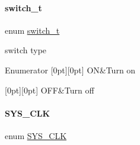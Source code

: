 \paragraph{\texorpdfstring{switch\+\_\+t}{switch\_t}}
{\footnotesize\ttfamily enum \mbox{\hyperlink{a00020_ab43e533f3793920486fb81c580f71564}{switch\+\_\+t}}}

switch type \begin{DoxyEnumFields}{Enumerator}
[0pt][0pt]{}\mbox{\label{a00020_ab43e533f3793920486fb81c580f71564a977d478dacaae531f95695750d1e9d03}} 
ON&Turn on \\
\hline

[0pt][0pt]{}\mbox{\label{a00020_ab43e533f3793920486fb81c580f71564aac132f2982b98bcaa3445e535a03ff75}} 
O\+FF&Turn off \\
\hline

\end{DoxyEnumFields}
\mbox{\label{a00020_ae3a2d501b8662e11b969fb4a5e195e5b}} 
\paragraph{\texorpdfstring{S\+Y\+S\+\_\+\+C\+LK}{SYS\_CLK}}
{\footnotesize\ttfamily enum \mbox{\hyperlink{a00020_ae3a2d501b8662e11b969fb4a5e195e5b}{S\+Y\+S\+\_\+\+C\+LK}}}

